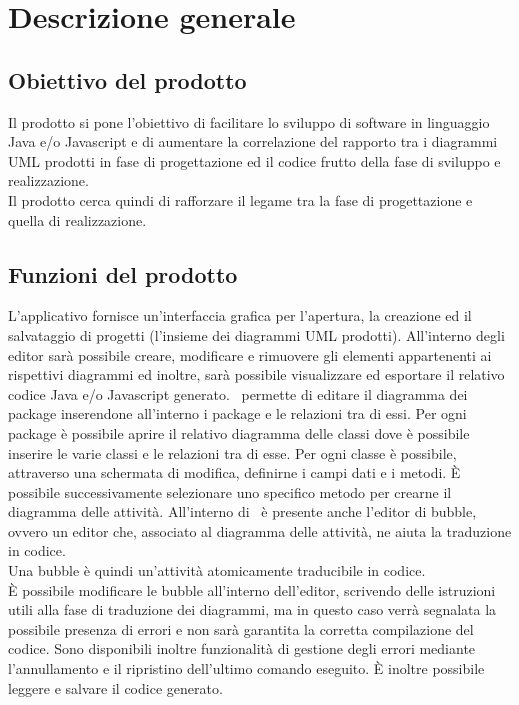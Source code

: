 \documentclass[../AnalisiDeiRequisiti.tex]{subfiles}
\begin{document}
	\section{Descrizione generale}
		\subsection{Obiettivo del prodotto}
			Il prodotto si pone l'obiettivo di facilitare lo sviluppo di software in
			linguaggio Java e/o Javascript e di aumentare la correlazione del rapporto tra
			i diagrammi UML prodotti in fase di progettazione ed il codice frutto della
			fase di sviluppo e realizzazione.\\
			Il prodotto cerca quindi di rafforzare il legame tra la fase di progettazione
			e quella di realizzazione.
		\subsection{Funzioni del prodotto}
			L'applicativo fornisce un'interfaccia grafica per l'apertura, la
			creazione ed il salvataggio di progetti (l'insieme dei diagrammi UML prodotti).
			All'interno degli editor sarà possibile creare, modificare e rimuovere gli
			elementi appartenenti ai rispettivi diagrammi ed inoltre, sarà possibile
			visualizzare ed esportare il relativo codice Java e/o Javascript generato.
			\progetto\ permette di editare il diagramma dei package inserendone all'interno i package e le relazioni tra di essi. Per ogni package è possibile aprire il relativo diagramma delle classi dove è possibile inserire le varie classi e le relazioni tra di esse. Per ogni classe è possibile, attraverso una schermata di modifica, definirne i campi dati e i metodi. È possibile successivamente selezionare uno specifico metodo per crearne il diagramma delle attività.
			All'interno di \progetto\ è presente anche l'editor di bubble, ovvero un editor
			che, associato al diagramma delle attività, ne aiuta la traduzione in codice.\\
			Una bubble è quindi un'attività atomicamente traducibile in codice.\\
			È possibile modificare le bubble all'interno dell'editor, scrivendo delle istruzioni
			utili alla fase di traduzione dei diagrammi, ma in questo caso verrà segnalata la
			possibile presenza di errori e non sarà garantita la corretta compilazione
			del codice.
			Sono disponibili inoltre funzionalità di gestione degli errori mediante l'annullamento e il ripristino dell'ultimo comando eseguito.
			È inoltre possibile leggere e salvare il codice generato.
\end{document}
